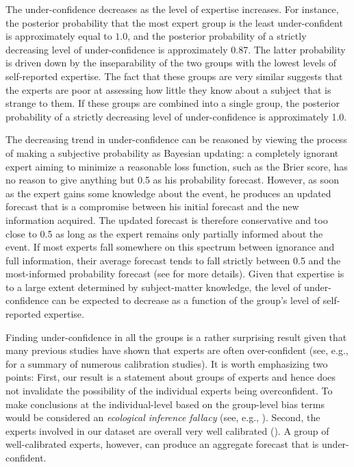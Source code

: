 \documentclass[aoas, preprint]{imsart}
\numberwithin{equation}{section}
\theoremstyle{plain}
\begin{document}
The under-confidence decreases as the level of  expertise increases.  For instance, the posterior probability that the most expert group is the least under-confident is approximately equal to $1.0$, and the posterior probability of a strictly decreasing level of under-confidence is approximately 0.87. The latter probability is driven down by the inseparability of the two groups with the lowest levels of self-reported expertise. The fact that these groups are very similar suggests that the experts are poor at assessing how little they know about a subject that is strange to them. If these groups are combined into a single group, the posterior probability of a strictly decreasing level of under-confidence is approximately 1.0. 

The decreasing trend in under-confidence can be reasoned by viewing the process of making a subjective probability  as Bayesian updating: a completely ignorant expert aiming to minimize a reasonable loss function, such as the Brier score, has no reason to give anything but 0.5 as his probability forecast. However, as soon as the expert gains some knowledge about the event, he produces an updated forecast that is a compromise between his initial forecast and the new information acquired. The updated forecast is therefore conservative and too close to 0.5 as long as the expert remains only partially informed about the event. If most experts fall somewhere on this spectrum between ignorance and full information, their average forecast tends to fall strictly between 0.5 and the most-informed probability forecast (see \citet{Baron} for more details). Given that expertise is to a large extent determined by subject-matter knowledge, the level of under-confidence can be expected to decrease as a function of the group's level of self-reported expertise.

Finding under-confidence in all the groups is a rather surprising result given that many previous studies have shown that experts are often over-confident (see, e.g., \citet{lichtenstein1977calibration, morgan1992uncertainty, bier2004implications} for a summary of numerous calibration studies). It is worth emphasizing two points: First, our result is a statement about groups of experts and hence does not invalidate the possibility of the individual experts being overconfident. To make conclusions at the individual-level based on the group-level bias terms would be considered an \textit{ecological inference fallacy} (see, e.g., \citet{lubinski1996seeing}). Second, the experts involved in our dataset are overall very well calibrated (\cite{mellers}). A group of well-calibrated experts, however, can produce an aggregate forecast that is under-confident.
\end{document}

